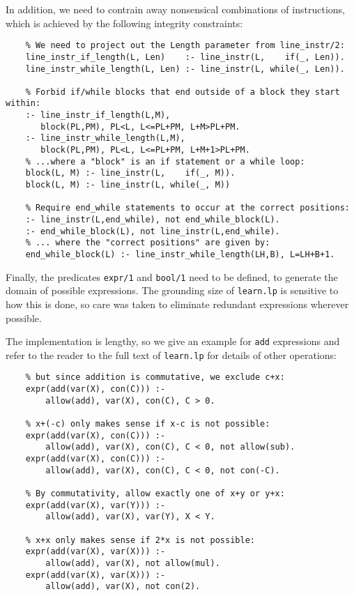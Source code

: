 \documentclass[a4paper,twoside,notitlepage]{report}
\begin{document}
In addition, we need to contrain away nonsensical combinations of 
instructions, which is achieved by the following integrity constraints:
\begin{Verbatim}
    % We need to project out the Length parameter from line_instr/2:
    line_instr_if_length(L, Len)    :- line_instr(L,    if(_, Len)).
    line_instr_while_length(L, Len) :- line_instr(L, while(_, Len)).

    % Forbid if/while blocks that end outside of a block they start within:
    :- line_instr_if_length(L,M),
       block(PL,PM), PL<L, L<=PL+PM, L+M>PL+PM.  
    :- line_instr_while_length(L,M),
       block(PL,PM), PL<L, L<=PL+PM, L+M+1>PL+PM.
    % ...where a "block" is an if statement or a while loop:
    block(L, M) :- line_instr(L,    if(_, M)).
    block(L, M) :- line_instr(L, while(_, M))

    % Require end_while statements to occur at the correct positions:
    :- line_instr(L,end_while), not end_while_block(L).
    :- end_while_block(L), not line_instr(L,end_while).
    % ... where the "correct positions" are given by:
    end_while_block(L) :- line_instr_while_length(LH,B), L=LH+B+1.    
\end{Verbatim}

Finally, the predicates \verb|expr/1| and \verb|bool/1| need to be 
defined, to generate the domain of possible expressions. The grounding 
size of \verb|learn.lp| is sensitive to how this is done, so care was 
taken to eliminate redundant expressions wherever possible.

The implementation is lengthy, so we give an example for \verb|add| 
expressions and refer to the reader to the full text of \verb|learn.lp| 
for details of other operations:
\begin{Verbatim}[samepage=true]
    % x+c makes sense if c is positive (but x+0 does not),
    % but since addition is commutative, we exclude c+x:
    expr(add(var(X), con(C))) :-
        allow(add), var(X), con(C), C > 0.

    % x+(-c) only makes sense if x-c is not possible:
    expr(add(var(X), con(C))) :-
        allow(add), var(X), con(C), C < 0, not allow(sub).
    expr(add(var(X), con(C))) :-
        allow(add), var(X), con(C), C < 0, not con(-C).

    % By commutativity, allow exactly one of x+y or y+x:
    expr(add(var(X), var(Y))) :-
        allow(add), var(X), var(Y), X < Y.

    % x+x only makes sense if 2*x is not possible:
    expr(add(var(X), var(X))) :-
        allow(add), var(X), not allow(mul).
    expr(add(var(X), var(X))) :-
        allow(add), var(X), not con(2).
\end{Verbatim}
\end{document}
